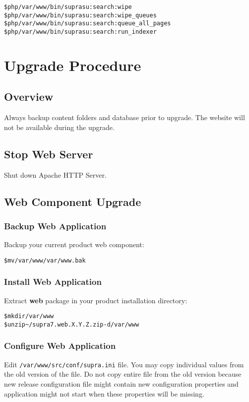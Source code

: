 \documentclass[12pt]{article}
\newcommand{\vigPackageName}{supra7}
\newcommand{\vigPathToProject}{/var/www}
\newcommand{\vigPathToSrc}{/src}
\newcommand{\vigReleasePath}{\textasciitilde/}
\newcommand{\vigReleaseVersion}{X.Y.Z}
\begin{document}
\begin{alltt}
\$ php \vigPathToProject/bin/supra su:search:wipe
\$ php \vigPathToProject/bin/supra su:search:wipe_queues
\$ php \vigPathToProject/bin/supra su:search:queue_all_pages
\$ php \vigPathToProject/bin/supra su:search:run_indexer
\end{alltt}

\section{Upgrade Procedure}

\subsection{Overview}
Always backup content folders and database prior to upgrade. The website will not be available during the upgrade.

\subsection{Stop Web Server}
Shut down Apache HTTP Server.

\subsection{Web Component Upgrade}

\subsubsection{Backup Web Application}
Backup your current product web component:

\begin{alltt}
\$ mv \vigPathToProject \vigPathToProject.bak
\end{alltt}

\subsubsection{Install Web Application}
Extract \textbf{web} package in your product installation directory:

\begin{alltt}
\$ mkdir \vigPathToProject
\$ unzip {\vigReleasePath}{\vigPackageName}.web.\vigReleaseVersion.zip -d \vigPathToProject
\end{alltt}

\subsubsection{Configure Web Application}
Edit \texttt{\vigPathToProject\vigPathToSrc/conf/supra.ini} file. You may copy individual values from the old version of the file. Do not copy entire file from the old version because new release configuration file might contain new configuration properties and application might not start when these properties will be missing.
\end{document}
